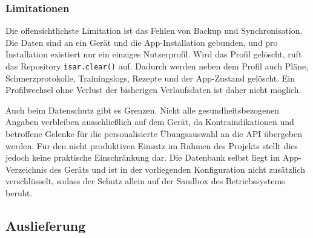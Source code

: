 \subsubsection{Limitationen}

Die offensichtlichste Limitation ist das Fehlen von Backup und Synchronisation. Die Daten sind an ein Gerät und die App-Installation gebunden, und pro Installation existiert nur ein einziges Nutzerprofil. Wird das Profil gelöscht, ruft das Repository \texttt{isar.clear()} auf. Dadurch werden neben dem Profil auch Pläne, Schmerzprotokolle, Trainingslogs, Rezepte und der App-Zustand gelöscht. Ein Profilwechsel ohne Verlust der bisherigen Verlaufsdaten ist daher nicht möglich.

Auch beim Datenschutz gibt es Grenzen. Nicht alle gesundheitsbezogenen Angaben verbleiben ausschließlich auf dem Gerät, da Kontraindikationen und betroffene Gelenke für die personalisierte Übungsauswahl an die API übergeben werden. Für den nicht produktiven Einsatz im Rahmen des Projekts stellt dies jedoch keine praktische Einschränkung dar. Die Datenbank selbst liegt im App-Verzeichnis des Geräts und ist in der vorliegenden Konfiguration nicht zusätzlich verschlüsselt, sodass der Schutz allein auf der Sandbox des Betriebssystems beruht.


\subsection{Auslieferung}

